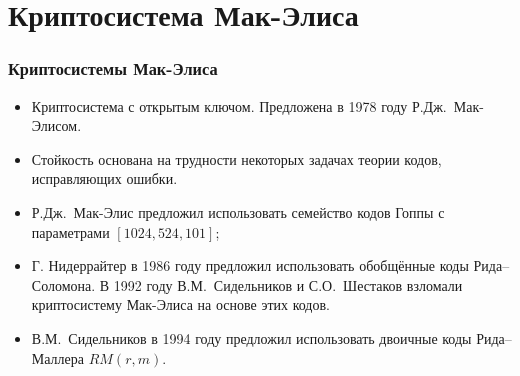 
\section{Криптосистема Мак-Элиса}

\begin{frame}
  \frametitle{Криптосистемы Мак-Элиса}

  \begin{itemize}
  \item
    Криптосистема с открытым ключом. Предложена в 1978 году Р.Дж.~Мак-Элисом.
  \pause
  \item
    Стойкость основана на трудности некоторых задачах теории кодов, исправляющих ошибки.
  \pause
  \item
        Р.Дж.~Мак-Элис предложил использовать  семейство кодов
        Гоппы с параметрами $[1024,524,101]$;
        \pause
  \item
        Г. Нидеррайтер в 1986 году предложил использовать обобщённые коды
        Рида--Соломона. В 1992 году В.М.~Сидельников и
        С.О.~Шестаков взломали криптосистему Мак-Элиса на основе
        этих кодов.
        \pause
  \item
        В.М.~Сидельников в 1994 году предложил использовать двоичные коды Рида--Маллера $RM(r,m)$.
  \end{itemize}
\end{frame}
